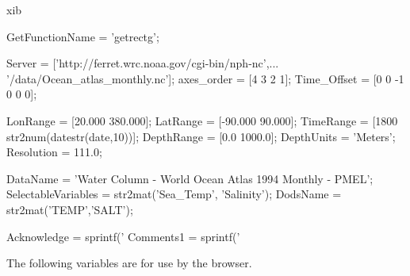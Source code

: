 \begin{vcode}{xib}

GetFunctionName = 'getrectg';

Server = ['http://ferret.wrc.noaa.gov/cgi-bin/nph-nc',...
   '/data/Ocean_atlas_monthly.nc'];
axes_order = [4 3 2 1];
Time_Offset = [0 0 -1 0 0 0];

LonRange = [20.000 380.000];
LatRange = [-90.000 90.000];
TimeRange = [1800 str2num(datestr(date,10))];
DepthRange = [0.0 1000.0];
DepthUnits = 'Meters';
Resolution = 111.0;

DataName = 'Water Column - World Ocean Atlas 1994 Monthly - PMEL';
SelectableVariables = str2mat('Sea_Temp', 'Salinity');
DodsName = str2mat('TEMP','SALT');

Acknowledge = sprintf('%
Comments1 = sprintf('%
\end{vcode}

The following variables are for use by the browser.

